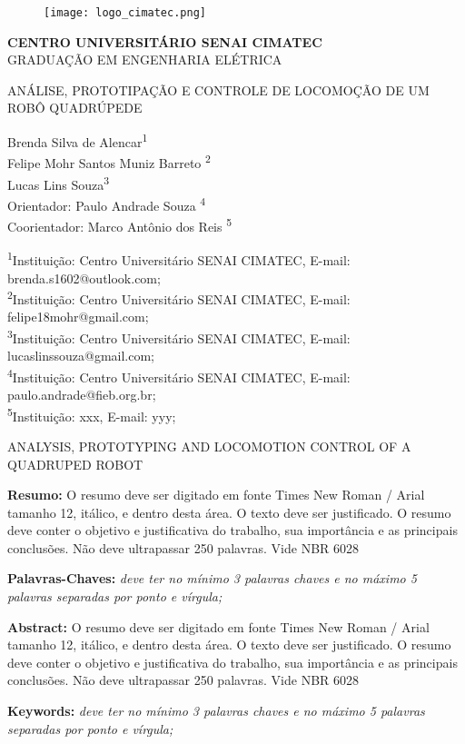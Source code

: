 \documentclass[../main.tex]{subfiles}
\makeatletter
\renewcommand\maketitle{
    \begin{figure}[t]
        \centering
        \texttt{[image: logo\_cimatec.png]}
    \end{figure}
    
    \begin{center}
        \textbf{\MakeUppercase{Centro Universitário Senai Cimatec}}
        \\
        \MakeUppercase{Graduação em Engenharia Elétrica}
        
        \vspace{\baselineskip}
        
        \begin{large}
          \MakeUppercase{Análise, prototipação e controle de locomoção de um robô quadrúpede}
        \end{large}
    \end{center}

    

    \begin{flushright}
        Brenda Silva de Alencar\textsuperscript{1}\\
        Felipe Mohr Santos Muniz Barreto \textsuperscript{2}\\
        Lucas Lins Souza\textsuperscript{3}\\
        Orientador: Paulo Andrade Souza \textsuperscript{4}\\
        Coorientador: Marco Antônio dos Reis \textsuperscript{5}\\
    \end{flushright}
    \begin{flushleft}
      \begin{small}
          \textsuperscript{1}Instituição: Centro Universitário SENAI CIMATEC, E-mail: brenda.s1602@outlook.com;\\
          \textsuperscript{2}Instituição: Centro Universitário SENAI CIMATEC, E-mail: felipe18mohr@gmail.com;\\
          \textsuperscript{3}Instituição: Centro Universitário SENAI CIMATEC, E-mail: lucaslinssouza@gmail.com;\\
          \textsuperscript{4}Instituição: Centro Universitário SENAI CIMATEC, E-mail: paulo.andrade@fieb.org.br;\\
          \textsuperscript{5}Instituição: xxx, E-mail: yyy;\\      
      \end{small}
    \end{flushleft}

    \begin{center}
      \begin{large}
        \MakeUppercase{Analysis, prototyping and locomotion control of a quadruped robot}
      \end{large}
    \end{center}

    \noindent\textbf{Resumo:} 
      O resumo deve ser digitado em fonte Times New Roman / Arial tamanho 12,  itálico, e dentro desta área. O texto deve ser justificado. O resumo deve conter o objetivo  e  justificativa  do  trabalho,  sua  importância  e  as  principais  conclusões.  Não  deve  ultrapassar 250 palavras. Vide NBR 6028

    \noindent\textbf{Palavras-Chaves:} 
      \textit{deve  ter  no  mínimo  3  palavras  chaves  e  no  máximo  5  palavras  separadas por ponto e vírgula;}

    \vspace{\baselineskip}
      
    \noindent\textbf{Abstract:} 
      O resumo deve ser digitado em fonte Times New Roman / Arial tamanho 12,  itálico, e dentro desta área. O texto deve ser justificado. O resumo deve conter o objetivo  e  justificativa  do  trabalho,  sua  importância  e  as  principais  conclusões.  Não  deve  ultrapassar 250 palavras. Vide NBR 6028
    
    \noindent\textbf{Keywords:} 
      \textit{deve  ter  no  mínimo  3  palavras  chaves  e  no  máximo  5  palavras  separadas por ponto e vírgula;}
    
}
\makeatother
\begin{document}
    \onecolumn
    \maketitle
    \newpage
    \twocolumn
\end{document}
